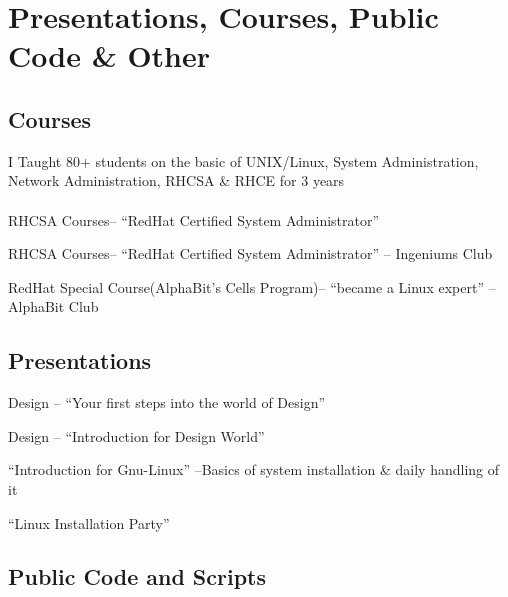 \documentclass{cv}
\begin{document}
\section{Presentations, Courses, Public Code \& Other}
\subsection{Courses}
\label{sec:class}
I Taught 80+ students on the basic of UNIX/Linux, System Administration, Network Administration, RHCSA \& RHCE for 3 years\\\\
    {RHCSA Courses-- ``RedHat Certified System Administrator''}
    {\esi}

    {RHCSA Courses-- ``RedHat Certified System Administrator''}
    {\esi -- Ingeniums Club}

    {RedHat Special Course(AlphaBit's Cells Program)-- ``became a Linux expert''}
    {\esi -- AlphaBit Club}


\subsection{Presentations}
    {Design -- ``Your first steps into the world of Design''}
    {\med}

    {Design -- ``Introduction for Design World''}
    {\esi}

    {``Introduction for Gnu-Linux'' --Basics of system installation \& daily handling of it
    \href {https://github.com/kebairia/My_Presentations/blob/master/intro_linux} {\gh}}
    {\med}

        {``Linux Installation Party''}
    {\med}

\subsection{Public Code and Scripts}
\label{sec:code}
\end{document}
